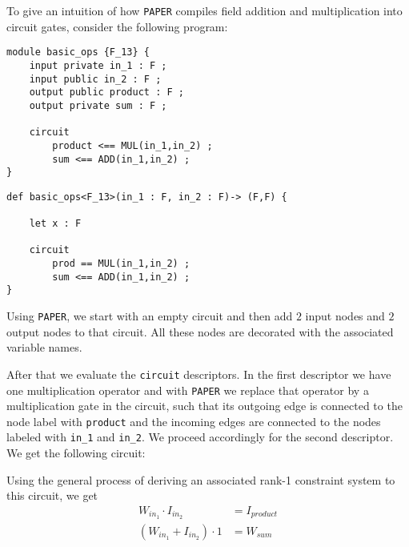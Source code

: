 \begin{example} To give an intuition of how \texttt{PAPER} compiles field addition and multiplication into circuit gates, consider the following program:
\begin{lstlisting}
module basic_ops {F_13} {
	input private in_1 : F ; 
	input public in_2 : F ; 
	output public product : F ;
	output private sum : F ; 

	circuit
		product <== MUL(in_1,in_2) ;
		sum <== ADD(in_1,in_2) ;
}
\end{lstlisting} 

\begin{lstlisting}
def basic_ops<F_13>(in_1 : F, in_2 : F)-> (F,F) {  

    let x : F 

	circuit
		prod == MUL(in_1,in_2) ;
		sum <== ADD(in_1,in_2) ;
}
\end{lstlisting} 

Using \texttt{PAPER}, we start with an empty circuit and then add $2$ input nodes and $2$ output nodes to that circuit. All these nodes are decorated with the associated variable names. 

After that we evaluate the \texttt{circuit} descriptors. In the first descriptor we have one multiplication operator and with \texttt{PAPER} we replace that operator by a multiplication gate in the circuit, such that its outgoing edge is connected to the node label with \texttt{product} and the incoming edges are connected to the nodes labeled with \texttt{in\_1} and \texttt{in\_2}. We proceed accordingly for the second descriptor. We get the following circuit: 
\begin{center}
\end{center} 
Using the general process of deriving an associated rank-1 constraint system to this circuit, we get
\begin{align*}
W_{in_1} \cdot I_{in_2} &= I_{product} \\
( W_{in_1} + I_{in_2} ) \cdot 1 &= W_{sum}
\end{align*}
\end{example} 

